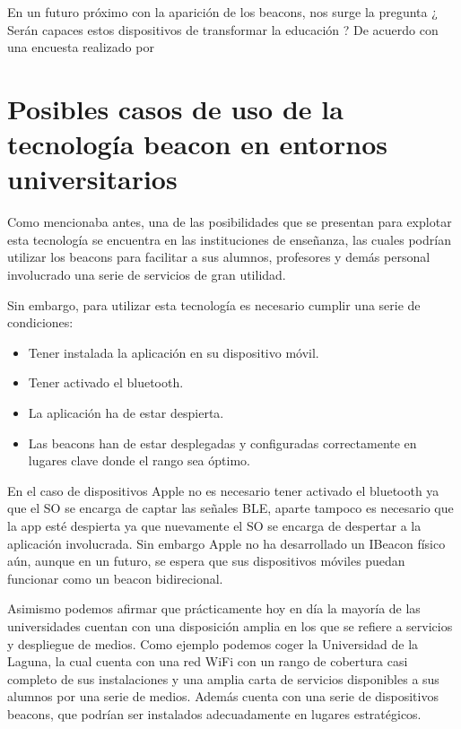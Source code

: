 En un futuro próximo con la aparición de los beacons, nos surge la pregunta ¿ Serán capaces estos dispositivos de transformar la educación ? De acuerdo con una encuesta realizado por %

\section {Posibles casos de uso de la tecnología beacon en entornos universitarios}

Como mencionaba antes, una de las posibilidades que se presentan para explotar esta tecnología se encuentra en las instituciones de enseñanza, las cuales podrían utilizar los beacons para facilitar a sus alumnos, profesores y demás personal involucrado  una serie de servicios de gran utilidad.

Sin embargo, para utilizar esta tecnología es necesario cumplir una serie de condiciones:

\begin{itemize}
\item Tener instalada la aplicación en su dispositivo móvil.
\item Tener activado el bluetooth.
\item La aplicación ha de estar despierta.
\item Las beacons han de estar desplegadas y configuradas correctamente en lugares clave donde el rango sea óptimo.
\end{itemize}

En el caso de dispositivos Apple no es necesario tener activado el bluetooth ya que el SO se encarga de captar las señales BLE, aparte tampoco es necesario que la app esté despierta ya que nuevamente el SO se encarga de despertar a la aplicación involucrada. Sin embargo Apple no ha desarrollado un IBeacon físico aún, aunque en un futuro, se espera que sus dispositivos móviles puedan funcionar como un beacon bidirecional.


Asimismo podemos afirmar que prácticamente hoy en día la mayoría de las universidades cuentan con una disposición amplia en los que se refiere a servicios y despliegue de medios. Como ejemplo podemos coger la Universidad de la Laguna, la cual cuenta con una red WiFi con un rango de cobertura casi completo de sus instalaciones y una amplia carta de servicios disponibles a sus alumnos por una serie de medios. Además cuenta con una serie de dispositivos beacons, que podrían ser instalados adecuadamente en lugares estratégicos. 

